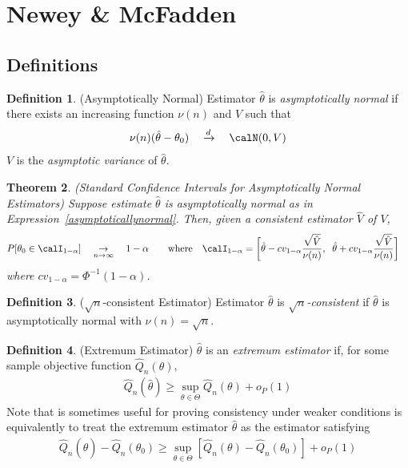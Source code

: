 \documentclass[12pt]{article}
\theoremstyle{plain}
\newtheorem{thm}{Theorem}[section]
\theoremstyle{definition}
\newtheorem{defn}[thm]{Definition}
\theoremstyle{remark}
\newcommand{\ra}{\rightarrow}
\DeclareMathOperator*{\argmax}{arg\;max}
\newcommand{\dto}{\xrightarrow{d}}
\begin{document}
\clearpage
\section{Newey \& McFadden}

\subsection{Definitions}

\begin{defn}(Asymptotically Normal)
Estimator $\hat{\theta}$ is \emph{asymptotically normal} if there
exists an increasing function $\nu(n)$ and $V$ such that
\begin{align}
  \nu(n)(\hat{\theta}-\theta_0)
  \quad\dto\quad
  \calN(0,V)
  \label{asymptoticallynormal}
\end{align}
$V$ is the \emph{asymptotic variance} of $\hat{\theta}$.
\end{defn}

\begin{thm}
\emph{(Standard Confidence Intervals for Asymptotically Normal Estimators)}
Suppose estimate $\hat{\theta}$ is asymptotically normal as in
Expression~\ref{asymptoticallynormal}.
Then, given a consistent estimator $\hat{V}$ of $V$,
\begin{align*}
  P[\theta_0\in \calI_{1-\alpha}]
  \quad&\underset{n\ra\infty}{\ra}\quad 1-\alpha
  \qquad\text{where}\quad
  \calI_{1-\alpha}
  =
  \bigg[
    \hat{\theta}
    -
    cv_{1-\alpha}
    \frac{\sqrt{\hat{V}}}{\nu(n)}
    ,
    \;\;
    \hat{\theta}
    +
    cv_{1-\alpha}
    \frac{\sqrt{\hat{V}}}{\nu(n)}
  \bigg]
\end{align*}
where $cv_{1-\alpha} = \Phi^{-1}(1-\alpha)$.
\end{thm}


\begin{defn}($\sqrt{n}$-consistent Estimator)
Estimator $\hat{\theta}$ is \emph{$\sqrt{n}$-consistent} if
$\hat{\theta}$ is asymptotically normal with $\nu(n)=\sqrt{n}$.
\end{defn}


\begin{defn}(Extremum Estimator)
$\hat{\theta}$ is an \emph{extremum estimator} if, for some
sample objective function $\hat{Q}_n(\theta)$,
\begin{align*}
  \widehat{Q}_n(\hat{\theta})
  \geq
  \sup_{\theta\in\Theta} \widehat{Q}_n(\theta)
  + o_P(1)
\end{align*}
Note that is sometimes useful for proving consistency under weaker
conditions is equivalently to treat the extremum estimator
$\hat{\theta}$ as the estimator satisfying
\begin{align*}
  \widehat{Q}_n(\hat{\theta})
  - \widehat{Q}_n(\theta_0)
  \geq
  \sup_{\theta\in\Theta}
  [\widehat{Q}_n(\theta) - \widehat{Q}_n(\theta_0)]
  + o_P(1)
\end{align*}
\end{defn}
\end{document}
